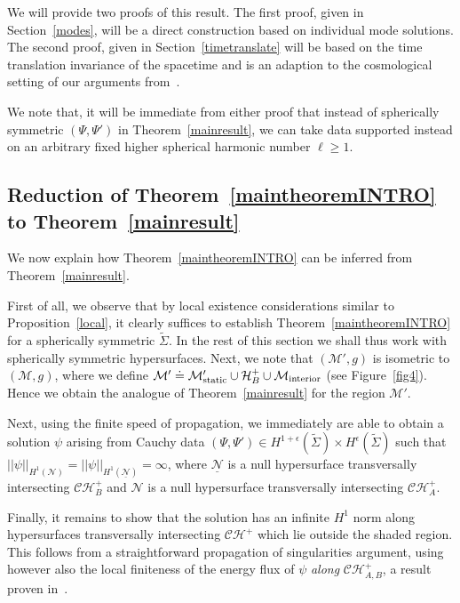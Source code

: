 \documentclass[A4,10pt]{article}
\begin{document}
We will provide two proofs of this result. The first proof, given in Section~\ref{modes}, will be a direct construction based on individual mode solutions. The second proof, given in Section~\ref{timetranslate} will be based on the time translation invariance of the spacetime and is an adaption to the cosmological setting of our arguments from~\cite{DafShlap}. 

We note that, it will be immediate from either proof that instead of spherically symmetric
$(\Psi,\Psi')$ in Theorem~\ref{mainresult},  we can take   data 
 supported instead on an arbitrary fixed higher
spherical harmonic number $\ell\ge 1$. 

\subsection{Reduction of Theorem~\ref{maintheoremINTRO} to Theorem~\ref{mainresult}}
\label{redux}


We now explain how Theorem~\ref{maintheoremINTRO} can be inferred from Theorem~\ref{mainresult}.

First of all, we observe that by
local existence considerations similar to Proposition~\ref{local},
it clearly suffices to establish Theorem~\ref{maintheoremINTRO} for a spherically symmetric $\widetilde\Sigma$. In the rest of this section we shall thus work with spherically symmetric hypersurfaces. Next, we note that $\left(\mathcal{M}',g\right)$ is isometric to $\left(\mathcal{M},g\right)$, where we define $\mathcal{M}' \doteq \mathcal{M}'_{{\rm static}}\cup\mathcal{H}^+_B\cup\mathcal{M}_{{\rm interior}}$ (see Figure~\ref{fig4}). Hence we obtain the analogue of Theorem~\ref{mainresult} for the region $\mathcal{M}'$. 

Next, 
using the finite speed of propagation, we immediately are able to obtain a solution $\psi$ arising from Cauchy data $\left(\Psi,\Psi'\right) \in H^{1+\epsilon}(\widetilde\Sigma) \times H^{\epsilon}(\widetilde\Sigma)$ such that $\left\vert\left\vert \psi\right\vert\right\vert_{H^1\left(\mathcal{N}\right)} =\left\vert\left\vert \psi\right\vert\right\vert_{H^1\left(\mathcal{\underline{N}}\right)} = \infty$, where $\mathcal{\underline{N}}$ is a null hypersurface transversally intersecting $\mathcal{CH}^+_B$ and $\mathcal{N}$ is a null hypersurface transversally intersecting $\mathcal{CH}^+_A$. 

Finally, it remains to show that the solution has an infinite $H^1$ norm along hypersurfaces transversally intersecting $\mathcal{CH}^+$ which lie outside the shaded region. This follows from a straightforward propagation of singularities argument, using however also
the local finiteness of the energy flux of $\psi$ \emph{along} 
$\mathcal{CH}^+_{A,B}$,
a result proven in~\cite{annefranzen}.
\end{document}
